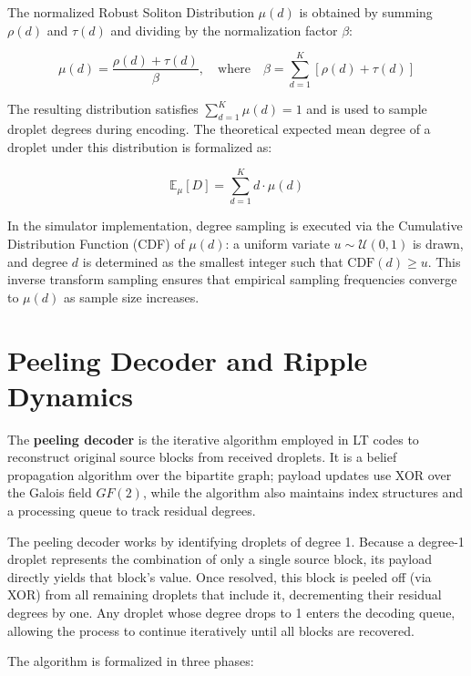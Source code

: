 The normalized Robust Soliton Distribution $\mu(d)$ is obtained by summing $\rho(d)$ and $\tau(d)$ and dividing by the normalization factor $\beta$:

\begin{equation}
    \label{eq:mu}
    \mu(d) = \frac{\rho(d) + \tau(d)}{\beta}, \quad \text{where} \quad \beta = \sum_{d=1}^{K} \left[\rho(d) + \tau(d)\right]
\end{equation}

The resulting distribution satisfies $\sum_{d=1}^{K} \mu(d) = 1$ and is used to sample droplet degrees during encoding. The theoretical expected mean degree of a droplet under this distribution is formalized as:

\begin{equation}
    \label{eq:grau_medio}
    \mathbb{E}_\mu[D] = \sum_{d=1}^{K} d \cdot \mu(d)
\end{equation}

In the simulator implementation, degree sampling is executed via the Cumulative Distribution Function (CDF) of $\mu(d)$: a uniform variate $u \sim \mathcal{U}(0,1)$ is drawn, and degree $d$ is determined as the smallest integer such that $\text{CDF}(d) \ge u$. This inverse transform sampling ensures that empirical sampling frequencies converge to $\mu(d)$ as sample size increases.

\section{Peeling Decoder and Ripple Dynamics}
\label{sec:peeling_decoder_and_ripple}

The \textbf{peeling decoder} is the iterative algorithm employed in LT codes to reconstruct original source blocks from received droplets. It is a belief propagation algorithm over the bipartite graph; payload updates use XOR over the Galois field $GF(2)$, while the algorithm also maintains index structures and a processing queue to track residual degrees.

The peeling decoder works by identifying droplets of degree 1. Because a degree-1 droplet represents the combination of only a single source block, its payload directly yields that block's value. Once resolved, this block is peeled off (via XOR) from all remaining droplets that include it, decrementing their residual degrees by one. Any droplet whose degree drops to 1 enters the decoding queue, allowing the process to continue iteratively until all blocks are recovered.

The algorithm is formalized in three phases:

